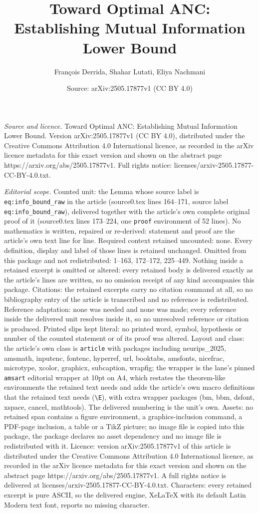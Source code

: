 \documentclass[10pt,a4paper]{amsart}
\title[Toward Optimal ANC: Establishing Mutual Information Lower Bo]{Toward Optimal ANC: Establishing Mutual Information Lower Bound}
\author{Fran\c{c}ois Derrida, Shahar Lutati, Eliya Nachmani}
\date{Source: arXiv:2505.17877v1 (CC BY 4.0)}
\begin{document}
\maketitle

\noindent\emph{Source and licence.} Toward Optimal ANC: Establishing Mutual Information Lower Bound. Version arXiv:2505.17877v1 (CC BY 4.0), distributed under the Creative Commons Attribution 4.0 International licence, as recorded in the arXiv licence metadata for this exact version and shown on the abstract page https://arxiv.org/abs/2505.17877v1. Full rights notice: licenses/arxiv-2505.17877-CC-BY-4.0.txt.\par\smallskip

\noindent\textit{Editorial scope.} Counted unit: the Lemma whose source label is \texttt{eq:info\_bound\_raw} in the article (source0.tex lines 164--171, source label \texttt{eq:info\_bound\_raw}), delivered together with the article's own complete original proof of it (source0.tex lines 173--224, one \texttt{proof} environment of 52 lines). No mathematics is written, repaired or re-derived: statement and proof are the article's own text line for line. Required context retained uncounted: none. Every definition, display and label of those lines is retained unchanged. Omitted from this package and not redistributed: 1--163, 172--172, 225--449. Nothing inside a retained excerpt is omitted or altered: every retained body is delivered exactly as the article's lines are written, so no omission receipt of any kind accompanies this package. Citations: the retained excerpts carry no citation command at all, so no bibliography entry of the article is transcribed and no reference is redistributed. Reference adaptation: none was needed and none was made; every reference inside the delivered unit resolves inside it, so no unresolved reference or citation is produced. Printed slips kept literal: no printed word, symbol, hypothesis or number of the counted statement or of its proof was altered. Layout and class: the article's own class is \texttt{article} with packages including neurips\_2025, amsmath, inputenc, fontenc, hyperref, url, booktabs, amsfonts, nicefrac, microtype, xcolor, graphicx, subcaption, wrapfig; the wrapper is the lane's pinned \texttt{amsart} editorial wrapper at 10pt on A4, which restates the theorem-like environments the retained text needs and adds the article's own macro definitions that the retained text needs (\texttt{\textbackslash E}), with extra wrapper packages (bm, bbm, dsfont, xspace, cancel, mathtools). The delivered numbering is the unit's own. Assets: no retained span contains a figure environment, a graphics-inclusion command, a PDF-page inclusion, a table or a TikZ picture; no image file is copied into this package, the package declares no asset dependency and no image file is redistributed with it. Licence: version arXiv:2505.17877v1 of this article is distributed under the Creative Commons Attribution 4.0 International licence, as recorded in the arXiv licence metadata for this exact version and shown on the abstract page https://arxiv.org/abs/2505.17877v1. A full rights notice is delivered at licenses/arxiv-2505.17877-CC-BY-4.0.txt. Characters: every retained excerpt is pure ASCII, so the delivered engine, XeLaTeX with its default Latin Modern text font, reports no missing character.
\end{document}
